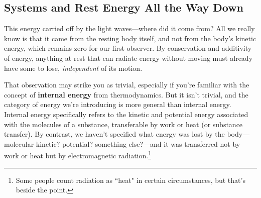 \documentclass[12pt]{article}
\begin{document}
\subsection{Systems and Rest Energy All the Way Down}\label{ssec:sy}

This energy carried off by the light waves---where did it come from? All we really know is that it came from the resting body itself, and not from the body's kinetic energy, which remains zero for our first observer. By conservation and additivity of energy, anything at rest that can radiate energy without moving must already have some to lose, \emph{independent} of its motion.

That observation may strike you as trivial, especially if you're familiar with the concept of \textbf{internal energy} from thermodynamics. But it isn't trivial, and the category of energy we're introducing is more general than internal energy. Internal energy specifically refers to the kinetic and potential energy associated with the molecules of a substance, transferable by work or heat (or substance transfer). By contrast, we haven't specified what energy was lost by the body---molecular kinetic? potential? something else?---and it was transferred not by work or heat but by electromagnetic radiation.\footnote{Some people count radiation as ``heat" in certain circumstances, but that's beside the point.}
\end{document}
